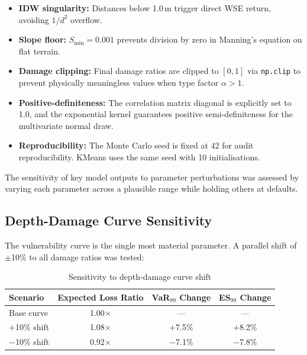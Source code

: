 \documentclass[11pt,a4paper]{article}
\begin{document}
\begin{itemize}[nosep]
    \item \textbf{IDW singularity:} Distances below 1.0\,m trigger direct WSE return,
          avoiding $1/d^2$ overflow.
    \item \textbf{Slope floor:} $S_{\min} = 0.001$ prevents division by zero in
          Manning's equation on flat terrain.
    \item \textbf{Damage clipping:} Final damage ratios are clipped to $[0, 1]$ via
          \texttt{np.clip} to prevent physically meaningless values when type factor
          $\alpha > 1$.
    \item \textbf{Positive-definiteness:} The correlation matrix diagonal is explicitly
          set to 1.0, and the exponential kernel guarantees positive semi-definiteness
          for the multivariate normal draw.
    \item \textbf{Reproducibility:} The Monte Carlo seed is fixed at 42 for audit
          reproducibility. KMeans uses the same seed with 10 initialisations.
\end{itemize}

\mkmsensitivity

The sensitivity of key model outputs to parameter perturbations was assessed by varying
each parameter across a plausible range while holding others at defaults.



\subsection{Depth-Damage Curve Sensitivity}

The vulnerability curve is the single most material parameter. A parallel shift of
$\pm$10\% to all damage ratios was tested:

\begin{table}[H]
\centering
\begin{tabular}{lccc}
    \toprule
    \textbf{Scenario} & \textbf{Expected Loss Ratio} & \textbf{VaR$_{99}$ Change} & \textbf{ES$_{99}$ Change} \\
    \midrule
    Base curve          & 1.00$\times$   & ---        & --- \\
    $+$10\% shift       & 1.08$\times$   & $+$7.5\%  & $+$8.2\% \\
    $-$10\% shift       & 0.92$\times$   & $-$7.1\%  & $-$7.8\% \\
    \bottomrule
\end{tabular}
\caption{Sensitivity to depth-damage curve shift}
\label{tab:sens_dd}
\end{table}
\end{document}
